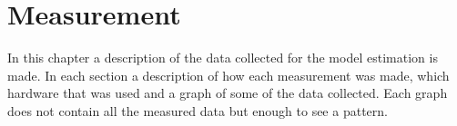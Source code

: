 \chapter{Measurement}\label{cha:measurement}

In this chapter a description of the data collected for the model estimation is made. In each section a description of how each measurement was made, which hardware that was used and a graph of some of the data collected. Each graph does not contain all the measured data but enough to see a pattern. 




%



